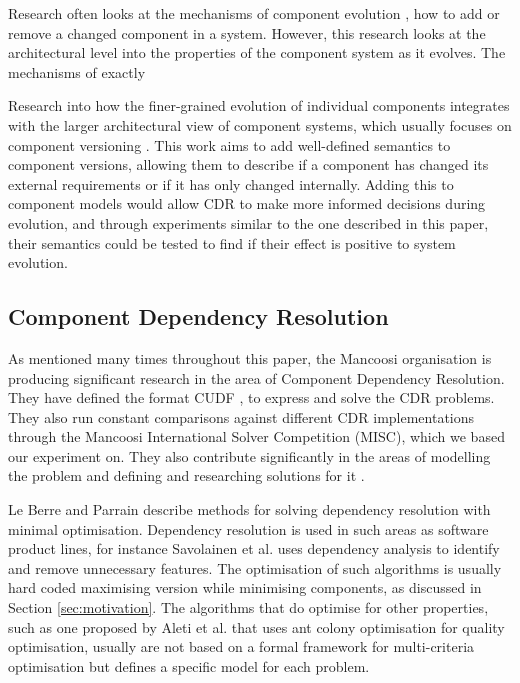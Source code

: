Research often looks at the mechanisms of component evolution \citep{Wang2006}, how to add or remove a changed component in a system.  
However, this research looks at the architectural level into the properties of the component system as it evolves.
The mechanisms of exactly 

Research into how the finer-grained evolution of individual components integrates with the larger architectural view of component systems, which
usually focuses on component versioning \cite{Bauml2009,Stuckenholz2005}.
This work aims to add well-defined semantics to component versions, 
allowing them to describe if a component has changed its external requirements or if it has only changed internally.
Adding this to component models would allow CDR to make more informed decisions during evolution, 
and through experiments similar to the one described in this paper,
their semantics could be tested to find if their effect is positive to system evolution.

\subsection{Component Dependency Resolution}

As mentioned many times throughout this paper, 
the Mancoosi organisation is producing significant research in the area of Component Dependency Resolution.
They have defined the format CUDF \cite{treinen2009common}, to express and solve the CDR problems.
They also run constant comparisons against different CDR implementations through the Mancoosi International Solver Competition (MISC),
which we based our experiment on.
They also contribute significantly in the areas of modelling the problem \cite{Cosmo2010} 
and defining and researching solutions for it \cite{Trezentos2010}.

Le Berre and Parrain \cite{Berre2008} describe methods for solving dependency resolution with minimal optimisation.
Dependency resolution is used in such areas as software product lines,
for instance Savolainen et al. \cite{savolainen_analyzing_2007} uses dependency analysis to identify and remove unnecessary features.
The optimisation of such algorithms is usually hard coded maximising version while minimising components, 
as discussed in Section \ref{sec:motivation}.
The algorithms that do optimise for other properties, 
such as one proposed by Aleti et al. \cite{Aleti2009} that uses ant colony optimisation for quality optimisation,
usually are not based on a formal framework for multi-criteria optimisation but defines a specific model for each problem.

